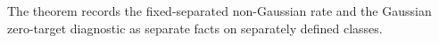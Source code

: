 The theorem records the fixed-separated non-Gaussian rate and the Gaussian zero-target diagnostic as separate facts on separately defined classes.